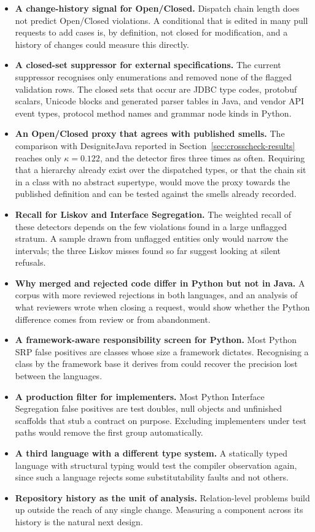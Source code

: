 \begin{itemize}
  \item \textbf{A change-history signal for Open/Closed.} Dispatch chain length does not predict
  Open/Closed violations. A conditional that is edited in many pull requests to add cases is, by
  definition, not closed for modification, and a history of changes could measure this directly.
  \item \textbf{A closed-set suppressor for external specifications.} The current suppressor
  recognises only enumerations and removed none of the flagged validation rows. The closed sets that
  occur are JDBC type codes, protobuf scalars, Unicode blocks and generated parser tables in Java, and
  vendor API event types, protocol method names and grammar node kinds in Python.
  \item \textbf{An Open/Closed proxy that agrees with published smells.} The comparison with
  DesigniteJava reported in Section~\ref{sec:crosscheck-results} reaches only $\kappa = 0.122$, and the
  detector fires three times as often. Requiring that a hierarchy already exist over the dispatched
  types, or that the chain sit in a class with no abstract supertype, would move the proxy towards the
  published definition and can be tested against the smells already recorded.
  \item \textbf{Recall for Liskov and Interface Segregation.} The weighted recall of these detectors
  depends on the few violations found in a large unflagged stratum. A sample drawn from unflagged
  entities only would narrow the intervals; the three Liskov misses found so far suggest looking at
  silent refusals.
  \item \textbf{Why merged and rejected code differ in Python but not in Java.} A corpus with more
  reviewed rejections in both languages, and an analysis of what reviewers wrote when closing a
  request, would show whether the Python difference comes from review or from abandonment.
  \item \textbf{A framework-aware responsibility screen for Python.} Most Python SRP false positives
  are classes whose size a framework dictates. Recognising a class by the framework base it derives
  from could recover the precision lost between the languages.
  \item \textbf{A production filter for implementers.} Most Python Interface Segregation false
  positives are test doubles, null objects and unfinished scaffolds that stub a contract on purpose.
  Excluding implementers under test paths would remove the first group automatically.
  \item \textbf{A third language with a different type system.} A statically typed language with
  structural typing would test the compiler observation again, since such a language rejects some
  substitutability faults and not others.
  \item \textbf{Repository history as the unit of analysis.} Relation-level problems build up outside
  the reach of any single change. Measuring a component across its history is the natural next design.
\end{itemize}

